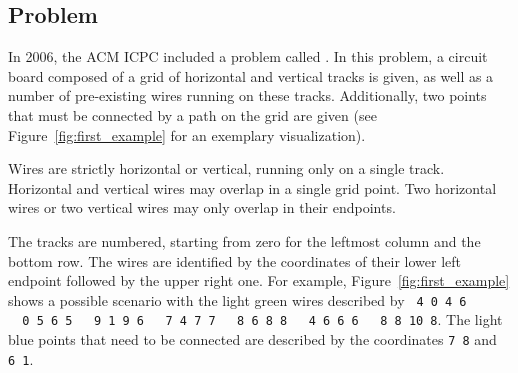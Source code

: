 \documentclass[sigconf,nonacm,screen]{acmart}
\begin{document}
\subsection{Problem}
In 2006, the ACM ICPC included a problem called  \cite{wiring_assistant_problem}. In this problem, a circuit board composed of a grid of horizontal and vertical tracks is given, as well as a number of pre-existing wires running on these tracks. Additionally, two points that must be connected by a path on the grid are given (see Figure~\ref{fig:first_example} for an exemplary visualization).

Wires are strictly horizontal or vertical, running only on a single track. Horizontal and vertical wires may overlap in a single grid point. Two horizontal wires or two vertical wires may only overlap in their endpoints.

The tracks are numbered, starting from zero for the leftmost column and the bottom row. The wires are identified by the coordinates of their lower left endpoint followed by the upper right one. For example, Figure~\ref{fig:first_example} shows a possible scenario with the light green wires described by \texttt{~4~0~4~6 \ \ 0~5~6~5 \ \ 9~1~9~6 \ \ 7~4~7~7 \ \ 8~6~8~8 \ \ 4~6~6~6 \ \ 8~8~10~8}. The light blue points that need to be connected are described by the coordinates \texttt{7~8} and \texttt{6~1}.
\end{document}
